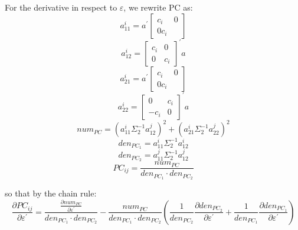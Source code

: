 \documentclass[a4paper,10pt]{article}
\begin{document}
For the derivative in respect to $\varepsilon$, we rewrite PC as:
\begin{equation}
a_{11}^{i} = a^{'} \left[ \begin{array}{cc}
 c_{i} & 0 \\ 0 c_{i}
\end{array} \right]
\end{equation}
\begin{equation}
a_{12}^{i} = \left[ \begin{array}{cc}
 c_{i} & 0 \\ 0 & c_{i}
\end{array} \right]^{'} a
\end{equation}
\begin{equation}
a_{21}^{i} = a^{'} \left[ \begin{array}{cc}
 c_{i} & 0 \\ 0 c_{i}
\end{array} \right]
\end{equation}
\begin{equation}
a_{22}^{i} = \left[ \begin{array}{cc}
 0 & c_{i} \\ -c_{i} & 0
\end{array} \right]^{'} a
\end{equation}
\begin{equation}
num_{PC} = (a_{11}^{i} \Sigma_{2}^{-1} a_{12}^{j})^{2} + (a_{21}^{i} \Sigma_{2}^{-1} a_{22}^{j})^{2}
\end{equation}
\begin{equation}
den_{PC_{1}} = a_{11}^{i} \Sigma_{2}^{-1} a_{12}^{i}
\end{equation}
\begin{equation}
den_{PC_{2}} = a_{11}^{j} \Sigma_{2}^{-1} a_{12}^{j}
\end{equation}
\begin{equation}
PC_{ij} = \frac{num_{PC}}{den_{PC_{1}} \cdot den_{PC_{2}}}
\end{equation}

so that by the chain rule:
\begin{equation}
\frac{\partial PC_{ij}}{\partial \varepsilon^{'}} = \frac{\frac{\partial num_{PC}}{\partial \varepsilon^{'}}}{den_{PC_{1}} \cdot den_{PC_{2}}} -
\frac{num_{PC}}{den_{PC_{1}} \cdot den_{PC_{2}}} \left( \frac{1}{den_{PC_{2}}} \frac{\partial den_{PC_{2}}}{\partial \varepsilon^{'}} +
 \frac{1}{den_{PC_{1}}} \frac{\partial den_{PC_{1}}}{\partial \varepsilon^{'}}  \right) 
\end{equation}
\end{document}

